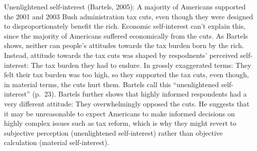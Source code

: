 \documentclass[12pt,econ]{sources/authesis}
\begin{document}
Unenlightened self-interest (Bartels, 2005): A majority of Americans supported the 2001 and 2003 Bush administration tax cuts, even though they were designed to disproportionately benefit the rich. Economic self-interest can't explain this, since the majority of Americans suffered economically from the cuts. As Bartels shows, neither can people's attitudes towards the tax burden born by the rich. Instead, attitude towards the tax cuts was shaped by respodnents' perceived self-interest: The tax burden they had to endure. In grossly exaggerated terms: They felt their tax burden was too high, so they supported the tax cuts, even though, in material terms, the cuts hurt them. Bartels call this ``unenlightened self-interest'' (p.~23). Bartels further shows that highly informed respondents had a very different attitude: They overwhelmingly opposed the cuts. He suggests that it may be unreasonable to expect Americans to make informed decisions on highly complex issues such as tax reform, which is why they might revert to subjective perception (unenlightened self-interest) rather than objective calculation (material self-interest).
\end{document}
